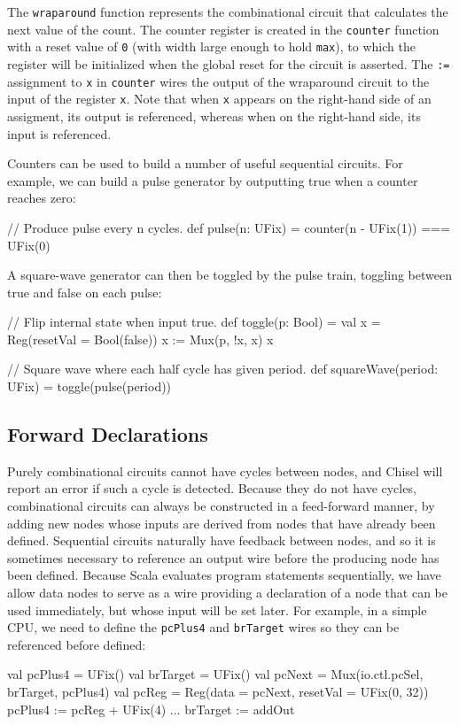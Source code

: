 \documentclass[twocolumn,10pt]{article}
\begin{document}
\noindent
The \verb!wraparound! function represents the combinational circuit
that calculates the next value of the count.  The counter register is
created in the \verb!counter! function with a reset value of \verb!0! (with width large enough to hold \verb+max+),
to which the register will be initialized when the global reset for the circuit is asserted.
The \verb!:=! assignment to \verb!x! in \verb!counter! wires the
output of the wraparound circuit to the input of the register
\verb!x!.  Note that when \verb!x! appears on the right-hand side of
an assigment, its output is referenced, whereas when on the right-hand
side, its input is referenced.

Counters can be used to build a number of useful sequential circuits.
For example, we can build a pulse generator by outputting true when
a counter reaches zero:
\begin{scala}
// Produce pulse every n cycles.
def pulse(n: UFix) = counter(n - UFix(1)) === UFix(0)
\end{scala}

\noindent
A square-wave generator can then be toggled by the pulse train,
toggling between true and false on each pulse:
\begin{scala}
// Flip internal state when input true.
def toggle(p: Bool) = {
  val x = Reg(resetVal = Bool(false))
  x := Mux(p, !x, x)
  x
}

// Square wave where each half cycle has given period.
def squareWave(period: UFix) = toggle(pulse(period))
\end{scala}

\subsection{Forward Declarations}

Purely combinational circuits cannot have cycles between nodes, and
Chisel will report an error if such a cycle is detected.  Because they
do not have cycles, combinational circuits can always be constructed
in a feed-forward manner, by adding new nodes whose inputs are derived
from nodes that have already been defined.  Sequential circuits
naturally have feedback between nodes, and so it is sometimes
necessary to reference an output wire before the producing node has
been defined.  Because Scala evaluates program statements
sequentially, we have allow data nodes to serve as a wire providing
a declaration of a node that can be used immediately, but whose
input will be set later.  
For example, in a simple CPU, we need to define the \verb!pcPlus4!
and \verb!brTarget! wires so they can be referenced before defined:
\begin{scala}
val pcPlus4  = UFix()
val brTarget = UFix()
val pcNext   = Mux(io.ctl.pcSel, brTarget, pcPlus4)
val pcReg    = Reg(data = pcNext, resetVal = UFix(0, 32))
pcPlus4     := pcReg + UFix(4)
...
brTarget    := addOut
\end{scala}
\end{document}
